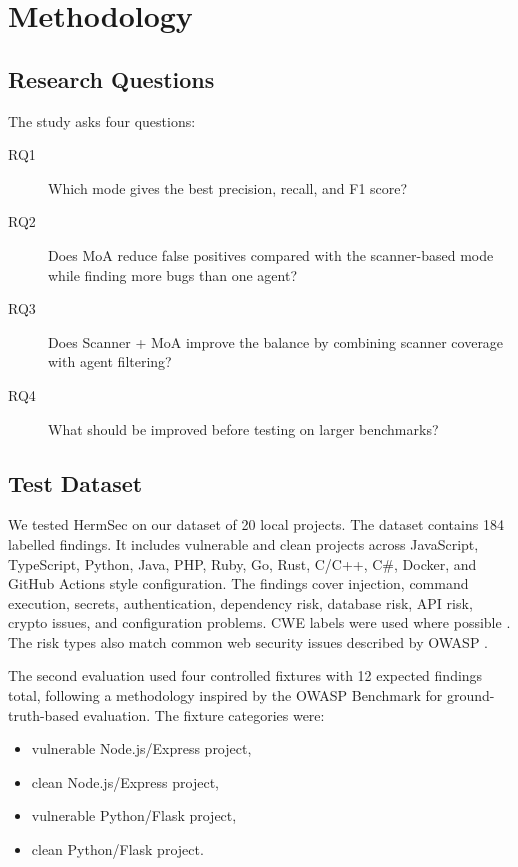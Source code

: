 \documentclass[sigconf,nonacm]{acmart}
\begin{document}
\section{Methodology}
\subsection{Research Questions}
The study asks four questions:

\begin{description}
  \item[RQ1] Which mode gives the best precision, recall, and F1 score?
  \item[RQ2] Does MoA reduce false positives compared with the scanner-based mode while finding more bugs than one agent?
  \item[RQ3] Does Scanner + MoA improve the balance by combining scanner coverage with agent filtering?
  \item[RQ4] What should be improved before testing on larger benchmarks?
\end{description}

\subsection{Test Dataset}

We tested HermSec on our dataset of 20 local projects. The dataset contains 184 labelled findings. It includes vulnerable and clean projects across JavaScript, TypeScript, Python, Java, PHP, Ruby, Go, Rust, C/C++, C\#, Docker, and GitHub Actions style configuration. The findings cover injection, command execution, secrets, authentication, dependency risk, database risk, API risk, crypto issues, and configuration problems. CWE labels were used where possible \cite{mitrecwe}. The risk types also match common web security issues described by OWASP \cite{owasptop10}.

The second evaluation used four controlled fixtures with 12 expected findings total, following a methodology inspired by the OWASP Benchmark \cite{owaspbenchmark} for ground-truth-based evaluation. The fixture categories were:

\begin{itemize}
  \item vulnerable Node.js/Express project,
  \item clean Node.js/Express project,
  \item vulnerable Python/Flask project,
  \item clean Python/Flask project.
\end{itemize}
\end{document}

